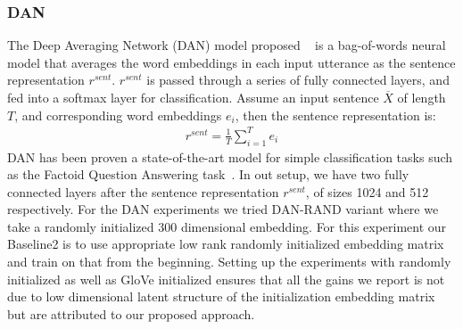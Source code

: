 \subsubsection{DAN}
The Deep Averaging Network (DAN) model proposed ~\cite{iyyer2015deep} is a bag-of-words neural model that averages the word embeddings in each input utterance as the sentence representation $r^{sent}$. $r^{sent}$ is passed through a series of fully connected layers, and fed into a softmax layer for classification. Assume an input sentence  $\overline{X}$ of length $T$, and corresponding word embeddings $e_i$, then the sentence representation is:  
\begin{gather}
r^{sent} = \frac{1}{T} \sum_{i=1}^T { e_i }
\end{gather}
DAN has been proven a state-of-the-art model for simple classification tasks such as the Factoid Question Answering task~\cite{iyyer2015deep}. In out setup, we have two fully connected layers after the sentence representation $r^{sent}$, of sizes 1024 and 512 respectively. For the DAN experiments we tried DAN-RAND \cite{iyyer2015deep} variant where we take a randomly initialized 300 dimensional embedding. For this experiment our Baseline2 is to use appropriate low rank randomly initialized embedding matrix and train on that from the beginning. Setting up the experiments with randomly initialized as well as GloVe initialized ensures that all the gains we report is not due to low dimensional latent structure of the initialization embedding matrix but are attributed to our proposed approach. 








